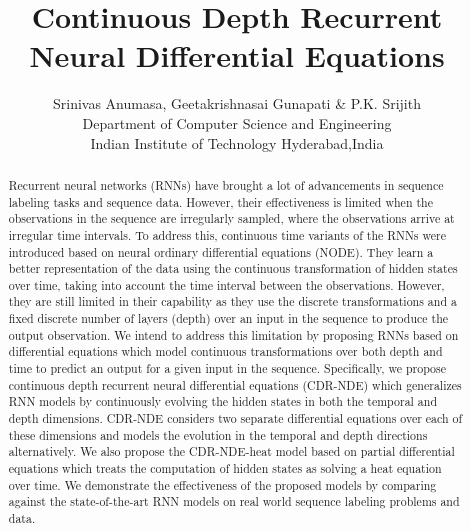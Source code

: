 \documentclass{article} %
\title{Continuous Depth Recurrent Neural Differential Equations}
\author{Srinivas Anumasa, Geetakrishnasai Gunapati  \& P.K. Srijith  \\
Department of Computer Science and Engineering\\
Indian Institute of Technology Hyderabad,India\\
}
\begin{document}
\maketitle

\begin{abstract}
Recurrent neural networks (RNNs) have brought a lot of advancements in sequence labeling tasks and sequence data. However, their effectiveness is limited  when the observations in the sequence are irregularly sampled, where the observations arrive at irregular time intervals. To address this, continuous time variants of the RNNs  were introduced based on neural  ordinary differential equations (NODE). They  learn a better representation of the data using the continuous transformation of hidden states over time, taking into account the time interval between the observations. However, they are still limited in their capability as they use the discrete transformations and a fixed discrete number of layers (depth) over an  input in the sequence to produce the output observation. We intend to address this limitation by proposing  RNNs based on  differential equations which model continuous  transformations over both  depth and time to predict an output for a given input in the sequence. Specifically, we propose continuous depth recurrent neural  differential equations (CDR-NDE) which generalizes  RNN models by continuously evolving the hidden states in both  the temporal and depth dimensions. CDR-NDE considers two separate differential equations over each of these dimensions and models the evolution in  the temporal and depth directions alternatively. We also propose the CDR-NDE-heat model based on partial differential equations which treats the computation of hidden states as solving a heat equation over time.  We demonstrate the effectiveness of the proposed models by comparing against the  state-of-the-art RNN models on  real world sequence labeling problems and data.
\end{abstract}
\end{document}
